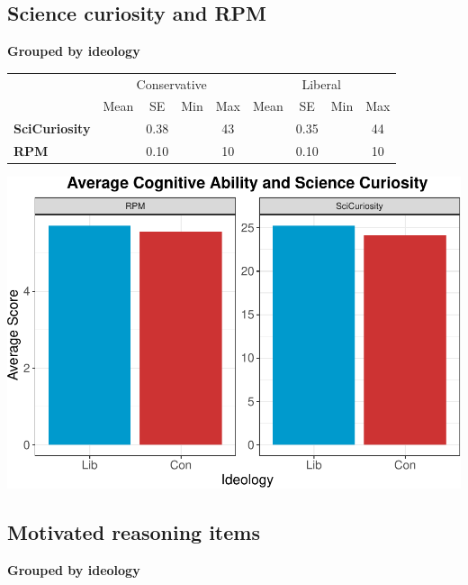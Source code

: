 \documentclass[
]{article}
\begin{document}
\hypertarget{science-curiosity-and-rpm}{%
\subsection{Science curiosity and RPM}\label{science-curiosity-and-rpm}}

\textbf{Grouped by ideology}

\begin{tabular}{>{}l||>{}c|c|>{}c|>{}c||>{}c|c|>{}c|c}
\hline
\multicolumn{1}{c|}{ } & \multicolumn{4}{c|}{Conservative} & \multicolumn{4}{c}{Liberal} \\
\cline{2-5} \cline{6-9}
  & Mean & SE & Min & Max & Mean & SE & Min & Max\\
\hline
\textbf{SciCuriosity} & \cellcolor{lightgray}{24.12} & 0.38 & \cellcolor{lightgray}{9} & 43 & \cellcolor{lightgray}{25.25} & 0.35 & \cellcolor{lightgray}{9} & 44\\
\hline
\textbf{RPM} & \cellcolor{lightgray}{5.55} & 0.10 & \cellcolor{lightgray}{1} & 10 & \cellcolor{lightgray}{5.71} & 0.10 & \cellcolor{lightgray}{1} & 10\\
\hline
\end{tabular}

\includegraphics{desc0829_files/figure-latex/cont-plot-1.pdf}

\hypertarget{motivated-reasoning-items}{%
\subsection{Motivated reasoning items}\label{motivated-reasoning-items}}

\textbf{Grouped by ideology}
\end{document}
